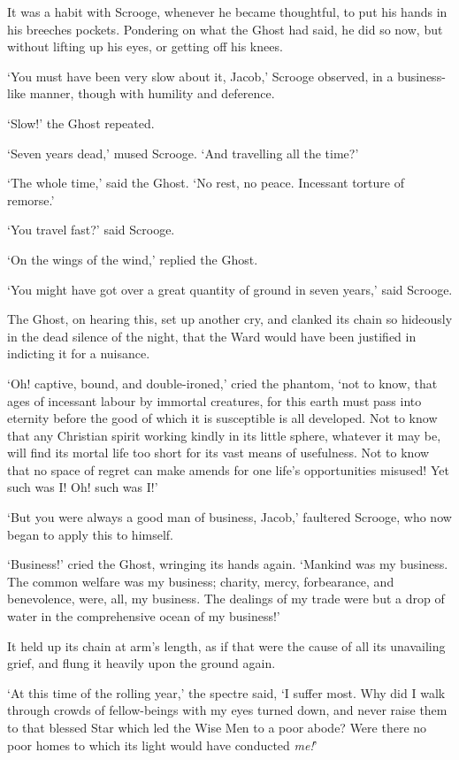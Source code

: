 \documentclass[11pt,twoside]{article}\makeatletter
\begin{document}
It was a habit with Scrooge, whenever he became thoughtful, to put his hands in his breeches pockets.  Pondering on what the Ghost had said, he did so now, but without lifting up his eyes, or getting off his knees.  \par
‘You must have been very slow about it, Jacob,’ Scrooge observed, in a business-like manner, though with humility and deference.   \par
‘Slow!’ the Ghost repeated.  \par
‘Seven years dead,’ mused Scrooge. ‘And travelling all the time?’  \par
‘The whole time,’ said the Ghost.  ‘No rest, no peace. Incessant torture of remorse.’  \par
‘You travel fast?’ said Scrooge.  \par
‘On the wings of the wind,’ replied the Ghost.  \par
‘You might have got over a great quantity of ground in seven years,’ said Scrooge.  \par
The Ghost, on hearing this, set up another cry, and clanked its chain so hideously in the dead silence of the night, that the Ward would have been justified in indicting it for a nuisance.  \par
‘Oh! captive, bound, and double-ironed,’ cried the phantom, ‘not to know, that ages of incessant labour by immortal creatures, for this earth must pass into eternity before the good of which it is susceptible is all developed. Not to know that any Christian spirit working kindly in its little sphere, whatever it may be, will find its mortal life too short for its vast means of usefulness.  Not to know that no space of regret can make amends for one life's opportunities misused!  Yet such was I!  Oh! such was I!’  \par
‘But you were always a good man of business, Jacob,’ faultered Scrooge, who now began to apply this to himself.  \par
‘Business!’ cried the Ghost, wringing its hands again.  ‘Mankind was my business.  The common welfare was my business; charity, mercy, forbearance, and benevolence, were, all, my business.  The dealings of my trade were but a drop of water in the comprehensive ocean of my business!’  \par
It held up its chain at arm's length, as if that were the cause of all its unavailing grief, and flung it heavily upon the ground again.  \par
‘At this time of the rolling year,’ the spectre said, ‘I suffer most.  Why did I walk through crowds of fellow-beings with my eyes turned down, and never raise them to that blessed Star which led the Wise Men to a poor abode? Were there no poor homes to which its light would have conducted \textit{me!}’  \par
\end{document}
